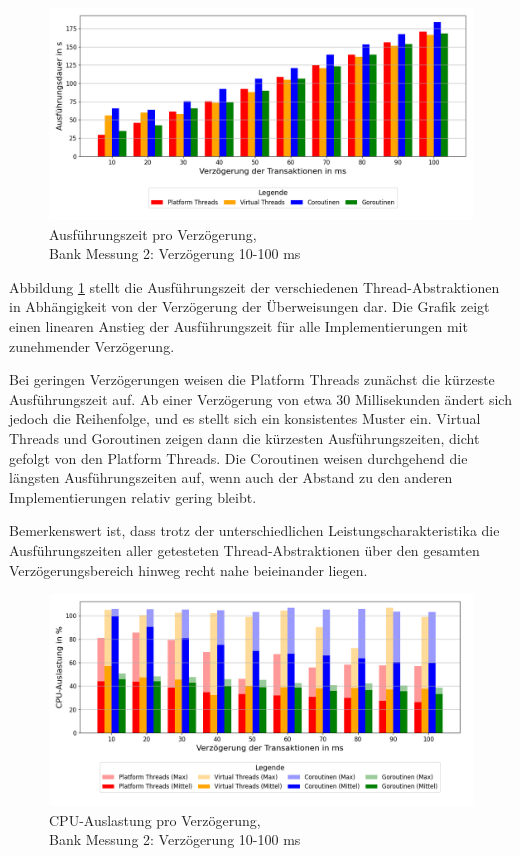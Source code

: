 \documentclass[fontsize=12pt,paper=a4,twoside=semi,parskip=half-,headsepline,headinclude]{scrreprt}
\begin{document}
\begin{figure}[H]
	\centering
	\includegraphics[scale=0.5]{figures/bank/delay80/execution_time_plot.png}
	\caption{Ausführungszeit pro Verzögerung,\\ Bank Messung 2: Verzögerung 10-100 ms}
	\label{fig:bankDelay80Zeit}
\end{figure}

Abbildung \ref{fig:bankDelay80Zeit} stellt die Ausführungszeit der verschiedenen Thread-Abstraktionen in Ab\-hän\-gig\-keit von der Verzögerung der Überweisungen dar. Die Grafik zeigt einen li\-ne\-aren Anstieg der Ausführungszeit für alle Implementierungen mit zunehmender Ver\-zö\-ge\-rung.

Bei geringen Verzögerungen weisen die Platform Threads zunächst die kürzeste Aus\-füh\-rungs\-zei\-t auf. Ab einer Verzögerung von etwa 30 Millisekunden ändert sich jedoch die Reihenfolge, und es stellt sich ein konsistentes Muster ein. Virtual Threads und Goroutinen zeigen dann die kürzesten Ausführungszeiten, dicht gefolgt von den Platform Threads. Die Coroutinen weisen durchgehend die längsten Ausführungszeiten auf, wenn auch der Abstand zu den anderen Implementierungen relativ gering bleibt.

Bemerkenswert ist, dass trotz der unterschiedlichen Leistungscharakteristika die Aus\-füh\-rungs\-zei\-ten aller getesteten Thread-Abstraktionen über den gesamten Ver\-zö\-ge\-rungs\-be\-reich hinweg recht nahe beieinander liegen.

\begin{figure}[H]
	\centering
	\includegraphics[scale=0.5]{figures/bank/delay80/cpu_usage_bar_plot.png}
	\caption{CPU-Auslastung pro Verzögerung,\\ Bank Messung 2: Verzögerung 10-100 ms}
	\label{fig:bankDelay80CPU}
\end{figure}
\end{document}
